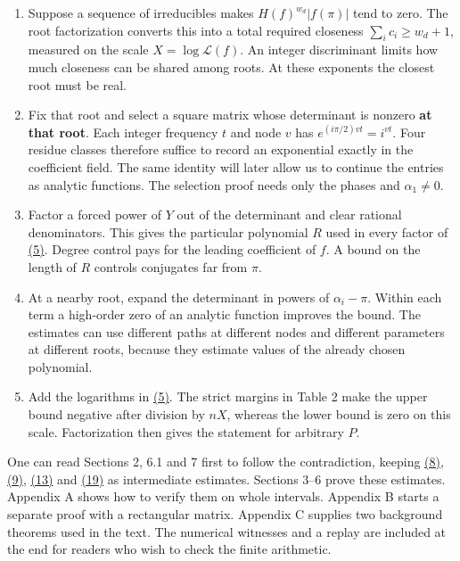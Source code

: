 \documentclass[11pt,a4paper]{article}
\providecommand{\tightlist}{\setlength{\itemsep}{0pt}\setlength{\parskip}{0pt}}
\begin{document}
\begin{enumerate}
\def\labelenumi{\arabic{enumi}.}
\tightlist
\item
  Suppose a sequence of irreducibles makes \(H(f)^{w_d}|f(\pi)|\) tend to zero. The root factorization converts this into a total required closeness \(\sum_i c_i\ge w_d+1\), measured on the scale \(X=\log\mathcal L(f)\). An integer discriminant limits how much closeness can be shared among roots. At these exponents the closest root must be real.
\item
  Fix that root and select a square matrix whose determinant is nonzero \textbf{at that root}. Each integer frequency \(t\) and node \(v\) has \(e^{(i\pi/2)vt}=i^{vt}\). Four residue classes therefore suffice to record an exponential exactly in the coefficient field. The same identity will later allow us to continue the entries as analytic functions. The selection proof needs only the phases and \(\alpha_1\ne0\).
\item
  Factor a forced power of \(Y\) out of the determinant and clear rational denominators. This gives the particular polynomial \(R\) used in every factor of \hyperref[eq:5]{(5)}. Degree control pays for the leading coefficient of \(f\). A bound on the length of \(R\) controls conjugates far from \(\pi\).
\item
  At a nearby root, expand the determinant in powers of \(\alpha_i-\pi\). Within each term a high-order zero of an analytic function improves the bound. The estimates can use different paths at different nodes and different parameters at different roots, because they estimate values of the already chosen polynomial.
\item
  Add the logarithms in \hyperref[eq:5]{(5)}. The strict margins in Table 2 make the upper bound negative after division by \(nX\), whereas the lower bound is zero on this scale. Factorization then gives the statement for arbitrary \(P\).
\end{enumerate}

One can read Sections 2, 6.1 and 7 first to follow the contradiction, keeping \hyperref[eq:8]{(8)}, \hyperref[eq:9]{(9)}, \hyperref[eq:13]{(13)} and \hyperref[eq:19]{(19)} as intermediate estimates. Sections 3--6 prove these estimates. Appendix A shows how to verify them on whole intervals. Appendix B starts a separate proof with a rectangular matrix. Appendix C supplies two background theorems used in the text. The numerical witnesses and a replay are included at the end for readers who wish to check the finite arithmetic.
\end{document}

